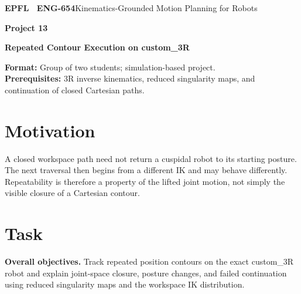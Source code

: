 \documentclass[11pt,a4paper]{article}
\begin{document}
{\small\textbf{EPFL \textbar\ ENG-654}\hfill Kinematics-Grounded Motion Planning for Robots}
\vspace{5mm}

{\color{epflred}\Large\bfseries Project 13}

{\LARGE\bfseries Repeated Contour Execution on custom\_3R\par}

\textbf{Format:} Group of two students; simulation-based project.\\
\textbf{Prerequisites:} 3R inverse kinematics, reduced singularity maps, and continuation of closed Cartesian paths.

\section*{Motivation}
A closed workspace path need not return a cuspidal robot to its starting
posture. The next traversal then begins from a different IK and may behave
differently. Repeatability is therefore a property of the lifted joint motion,
not simply the visible closure of a Cartesian contour.

\section*{Task}
\textbf{Overall objectives.} Track repeated position contours on the exact custom\_3R robot and explain
joint-space closure, posture changes, and failed continuation using reduced
singularity maps and the workspace IK distribution.
\end{document}
